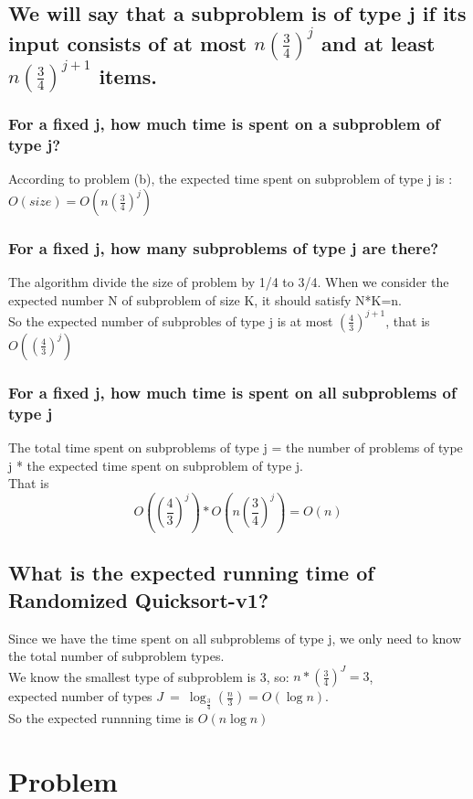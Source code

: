 \documentclass{article}
\begin{document}
\subsection{We will say that a subproblem is of type j if its input consists of at most $n(\frac{3}{4})^j$ and at least $n(\frac{3}{4})^{j+1}$ items.}
\subsubsection{For a fixed j, how much time is spent on a subproblem of type j?}
According to problem (b), the expected time spent on subproblem of type j is : $O(size)=O(n(\frac{3}{4})^j)$
\subsubsection{For a fixed j, how many subproblems of type j are there?}
The algorithm divide the size of problem by 1/4 to 3/4. When we consider the expected number N of subproblem of size K,  it should satisfy N*K=n.\\
So the expected number of subprobles of type j is at most $({\frac{4}{3}})^{j+1}$, that is $O(({\frac{4}{3}})^j)$
\subsubsection{For a fixed j, how much time is spent on all subproblems of type j}
The total time spent on subproblems of type j = the number of problems of type j * the expected time spent on subproblem of type j.\\
That is $$O(({\frac{4}{3}})^j)*O(n(\frac{3}{4})^j)=O(n)$$

\subsection{What is the expected running time of Randomized Quicksort-v1?}
Since we have the time spent on all subproblems of type j, we only need to know the total number of subproblem types.\\
We know the smallest type of subproblem is 3, so: $n*(\frac{3}{4})^J=3$,\\ expected number of types $J\ =\ \log_{\frac{3}{4}} (\frac{n}{3}) = O(\log n)$.\\
So the expected runnning time is $O(n\log n)$

\section{Problem \uppercase\expandafter{}}
\end{document}
